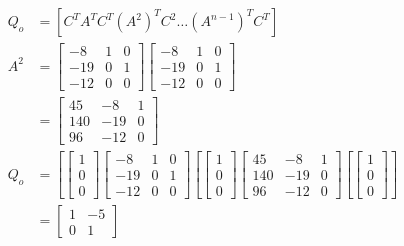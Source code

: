\documentclass[main.tex]{subfiles}
\begin{document}
\begin{enumerate}
\begin{enumerate}
        $$
        \begin{aligned}
        Q_o &= \left[C^T A^T C^T\left(A^2\right)^T C^2 \ldots\left(A^{n-1}\right)^T C^T\right]\\
        A^2 &= \left[\begin{array}{lll}
        -8 & 1 & 0 \\
        -19 & 0 & 1 \\
        -12 & 0 & 0
        \end{array}\right] \left[\begin{array}{lll}
        -8 & 1 & 0 \\
        -19 & 0 & 1 \\
        -12 & 0 & 0
        \end{array}\right]\\
        & = \left[\begin{array}{ccc}
        45 & -8 & 1 \\
        140 & -19 & 0 \\
        96 & -12 & 0
        \end{array}\right] \\
        Q_o &= \left[ \left[\begin{array}{l}
        1 \\
        0 \\
        0
        \end{array}\right] \left[\begin{array}{lll}
        -8 & 1 & 0 \\
        -19 & 0 & 1 \\
        -12 & 0 & 0
        \end{array}\right] \left[ \left[\begin{array}{l}
        1 \\
        0 \\
        0
        \end{array}\right] \left[\begin{array}{ccc}
        45 & -8 & 1 \\
        140 & -19 & 0 \\
        96 & -12 & 0
        \end{array}\right] \left[ \left[\begin{array}{l}
        1 \\
        0 \\
        0
        \end{array}\right] \right] \\
        & = \left[\begin{array}{ll}
        1 & -5 \\
        0 & 1
        \end{array}\right]
        \end{aligned}
        $$
        

\end{enumerate}
\end{enumerate}
\end{document}
